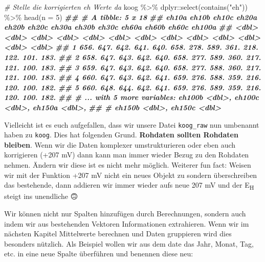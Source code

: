 \documentclass[
]{article}
\newenvironment{Shaded}{\begin{snugshade}}{\end{snugshade}}
\newcommand{\AttributeTok}[1]{\textcolor[rgb]{0.77,0.63,0.00}{#1}}
\newcommand{\CommentTok}[1]{\textcolor[rgb]{0.56,0.35,0.01}{\textit{#1}}}
\newcommand{\DecValTok}[1]{\textcolor[rgb]{0.00,0.00,0.81}{#1}}
\newcommand{\DocumentationTok}[1]{\textcolor[rgb]{0.56,0.35,0.01}{\textbf{\textit{#1}}}}
\newcommand{\FunctionTok}[1]{\textcolor[rgb]{0.00,0.00,0.00}{#1}}
\newcommand{\NormalTok}[1]{#1}
\newcommand{\SpecialCharTok}[1]{\textcolor[rgb]{0.00,0.00,0.00}{#1}}
\newcommand{\StringTok}[1]{\textcolor[rgb]{0.31,0.60,0.02}{#1}}
\begin{document}
\begin{Shaded}
\begin{Highlighting}[]
\CommentTok{\# Stelle die korrigierten eh Werte da}
\NormalTok{koog }\SpecialCharTok{\%\textgreater{}\%}
\NormalTok{  dplyr}\SpecialCharTok{::}\FunctionTok{select}\NormalTok{(}\FunctionTok{contains}\NormalTok{(}\StringTok{"eh"}\NormalTok{)) }\SpecialCharTok{\%\textgreater{}\%}
  \FunctionTok{head}\NormalTok{(}\AttributeTok{n =} \DecValTok{5}\NormalTok{)}
\DocumentationTok{\#\# \# A tibble: 5 x 18}
\DocumentationTok{\#\#   eh10a eh10b eh10c eh20a eh20b eh20c eh30a eh30b eh30c eh60a eh60b eh60c eh100a}
\DocumentationTok{\#\#   \textless{}dbl\textgreater{} \textless{}dbl\textgreater{} \textless{}dbl\textgreater{} \textless{}dbl\textgreater{} \textless{}dbl\textgreater{} \textless{}dbl\textgreater{} \textless{}dbl\textgreater{} \textless{}dbl\textgreater{} \textless{}dbl\textgreater{} \textless{}dbl\textgreater{} \textless{}dbl\textgreater{} \textless{}dbl\textgreater{}  \textless{}dbl\textgreater{}}
\DocumentationTok{\#\# 1  656.  647.  642.  641.  640.  658.  278.  589.  361.  218.  122.  101.   183.}
\DocumentationTok{\#\# 2  658.  647.  643.  642.  640.  658.  277.  589.  360.  217.  121.  100.   183.}
\DocumentationTok{\#\# 3  659.  647.  643.  642.  640.  658.  277.  588.  360.  217.  121.  100.   183.}
\DocumentationTok{\#\# 4  660.  647.  643.  642.  641.  659.  276.  588.  359.  216.  120.  100.   182.}
\DocumentationTok{\#\# 5  660.  648.  644.  642.  641.  659.  276.  589.  359.  216.  120.  100.   182.}
\DocumentationTok{\#\# \# ... with 5 more variables: eh100b \textless{}dbl\textgreater{}, eh100c \textless{}dbl\textgreater{}, eh150a \textless{}dbl\textgreater{},}
\DocumentationTok{\#\# \#   eh150b \textless{}dbl\textgreater{}, eh150c \textless{}dbl\textgreater{}}
\end{Highlighting}
\end{Shaded}

Vielleicht ist es euch aufgefallen, dass wir unsere Datei \texttt{koog\_raw} nun umbenannt haben zu \texttt{koog}. Dies hat folgenden Grund. \textbf{Rohdaten sollten Rohdaten bleiben}. Wenn wir die Daten komplexer umstrukturieren oder eben auch korrigieren (+207 mV) dann kann man immer wieder Bezug zu den Rohdaten nehmen. Ändern wir diese ist es nicht mehr möglich. Weiterer fun fact: Weisen wir mit der Funktion +207 mV nicht ein neues Objekt zu sondern überschreiben das bestehende, dann addieren wir immer wieder aufs neue 207 mV und der E\textsubscript{H} steigt ins unendliche 🙃

Wir können nicht nur Spalten hinzufügen durch Berechnungen, sondern auch indem wir aus bestehenden Vektoren Informationen extrahieren. Wenn wir im nächsten Kapitel Mittelwerte berechnen und Daten gruppieren wird dies besonders nützlich. Als Beispiel wollen wir aus dem date das Jahr, Monat, Tag, etc. in eine neue Spalte überführen und benennen diese neu:
\end{document}
